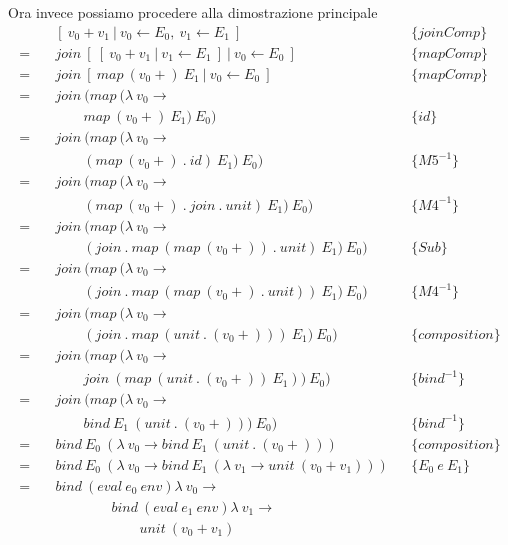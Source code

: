 \begin{framed}
Ora invece possiamo procedere alla dimostrazione principale
\begin{align*}
    &\quad{[\ v_0 + v_1\ |\ v_0 \leftarrow E_0,\ v_1 \leftarrow E_1\ ]} && \{joinComp\}\\
    =&\quad join\ {[\ {[\ v_0 + v_1\ |\ v_1 \leftarrow E_1\ ]}\ |\ v_0 \leftarrow E_0 \ ]} && \{mapComp\}\\
    =&\quad join\ {[\ map\ (v_0+)\ E_1\ |\ v_0 \leftarrow E_0 \ ]} && \{mapComp\}\\
    =&\quad join\ (map\ (\lambda\ v_0 \to\\
     &\quad \qquad map\ (v_0+)\ E_1)\ E_0 ) && \{id\}\\
    =&\quad join\ (map\ (\lambda\ v_0 \to\\
     &\quad \qquad (map\ (v_0+)\ .\ id)\ E_1)\ E_0 ) && \{M5^{-1}\}\\
    =&\quad join\ (map\ (\lambda\ v_0 \to\\
     &\quad \qquad (map\ (v_0+)\ .\ join\ .\ unit)\ E_1)\ E_0 ) && \{M4^{-1}\}\\
    =&\quad join\ (map\ (\lambda\ v_0 \to\\
     &\quad \qquad (join\ .\ map\ (map\ (v_0+))\ .\ unit)\ E_1)\ E_0 ) && \{Sub\}\\
    =&\quad join\ (map\ (\lambda\ v_0 \to\\
     &\quad \qquad (join\ .\ map\ (map\ (v_0+)\ .\ unit))\ E_1)\ E_0 ) && \{M4^{-1}\}\\
    =&\quad join\ (map\ (\lambda\ v_0 \to\\
     &\quad \qquad (join\ .\ map\ (unit\ .\ (v_0+)))\ E_1)\ E_0 ) && \{composition\}\\
    =&\quad join\ (map\ (\lambda\ v_0 \to\\
     &\quad \qquad join\ (map\ (unit\ .\ (v_0+))\ E_1))\ E_0 ) && \{bind^{-1}\}\\
    =&\quad join\ (map\ (\lambda\ v_0 \to\\
     &\quad \qquad bind\ E_1\ (unit\ .\ (v_0+)))\ E_0 ) && \{bind^{-1}\}\\
    =&\quad bind\ E_0\ (\lambda\ v_0 \to bind\ E_1\ (unit\ .\ (v_0+))) && \{composition\}\\
    =&\quad bind\ E_0\ (\lambda\ v_0 \to bind\ E_1\ (\lambda\ v_1 \to unit\ (v_0+v_1))) && \{E_0\ e\ E_1\}\\
    =&\quad bind\ (eval\ e_0\ env) \lambda\ v_0 \to \\
     &\quad \qquad \qquad bind\ (eval\ e_1\ env) \lambda\ v_1 \to \\
     &\quad \qquad \qquad \qquad unit\ (v_0+v_1)
  \end{align*}
\end{framed}

